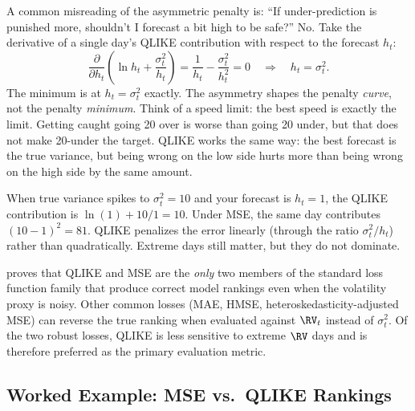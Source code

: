 \begin{intuition}
A common misreading of the asymmetric penalty is: ``If under-prediction is punished more, shouldn't I forecast a bit high to be safe?''
No.
Take the derivative of a single day's QLIKE contribution with respect to the forecast $h_t$:
\[
\frac{\partial}{\partial h_t}\left(\ln h_t + \frac{\sigma^2_t}{h_t}\right) = \frac{1}{h_t} - \frac{\sigma^2_t}{h_t^2} = 0 \quad \Longrightarrow \quad h_t = \sigma^2_t.
\]
The minimum is at $h_t = \sigma^2_t$ exactly.
The asymmetry shapes the penalty \emph{curve}, not the penalty \emph{minimum}.
Think of a speed limit: the best speed is exactly the limit.
Getting caught going 20 over is worse than going 20 under, but that does not make 20-under the target.
QLIKE works the same way: the best forecast is the true variance, but being wrong on the low side hurts more than being wrong on the high side by the same amount.
\end{intuition}

\begin{intuition}
When true variance spikes to $\sigma^2_t = 10$ and your forecast is $h_t = 1$, the QLIKE contribution is $\ln(1) + 10/1 = 10$.
Under MSE, the same day contributes $(10 - 1)^2 = 81$.
QLIKE penalizes the error linearly (through the ratio $\sigma^2_t / h_t$) rather than quadratically.
Extreme days still matter, but they do not dominate.
\end{intuition}

\begin{keyresult}
\citet{Patton2011} proves that QLIKE and MSE are the \emph{only} two members of the standard loss function family that produce correct model rankings even when the volatility proxy is noisy.
Other common losses (MAE, HMSE, heteroskedasticity-adjusted MSE) can reverse the true ranking when evaluated against $\RV_t$ instead of $\sigma^2_t$.
Of the two robust losses, QLIKE is less sensitive to extreme $\RV$ days and is therefore preferred as the primary evaluation metric.
\end{keyresult}

\subsection{Worked Example: MSE vs.\ QLIKE Rankings}


